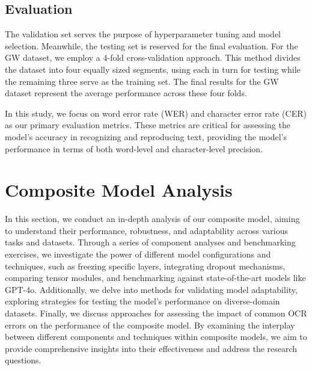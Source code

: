 \subsection{Evaluation}
\label{subsec:4_evaluation}
The validation set serves the purpose of hyperparameter tuning and model selection. Meanwhile, the testing set is reserved for the final evaluation. For the GW dataset, we employ a 4-fold cross-validation approach. This method divides the dataset into four equally sized segments, using each in turn for testing while the remaining three serve as the training set. The final results for the GW dataset represent the average performance across these four folds.

In this study, we focus on word error rate (WER) and character error rate (CER) as our primary evaluation metrics. These metrics are critical for assessing the model's accuracy in recognizing and reproducing text, providing the model's performance in terms of both word-level and character-level precision.
\section{Composite Model Analysis}
\label{sec:4_composite_model_analysis}
In this section, we conduct an in-depth analysis of our composite model, aiming to understand their performance, robustness, and adaptability across various tasks and datasets. Through a series of component analyses and benchmarking exercises, we investigate the power of different model configurations and techniques, such as freezing specific layers, integrating dropout mechanisms, comparing tensor modules, and benchmarking against state-of-the-art models like GPT-4o. Additionally, we delve into methods for validating model adaptability, exploring strategies for testing the model's performance on diverse-domain datasets. Finally, we discuss approaches for assessing the impact of common OCR errors on the performance of the composite model. By examining the interplay between different components and techniques within composite models, we aim to provide comprehensive insights into their effectiveness and address the research questions.

